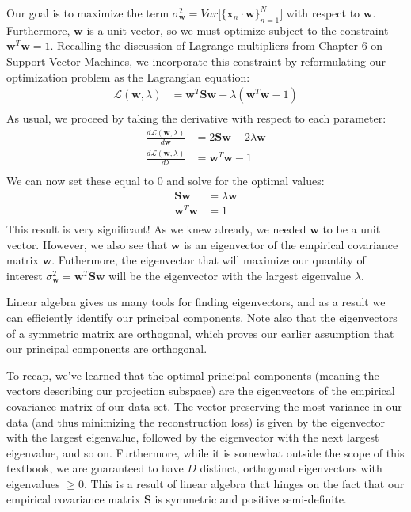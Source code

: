 Our goal is to maximize the term $\sigma^{2}_{\textbf{w}} = Var\big[\{\textbf{x}_{n} \cdot \textbf{w}\}_{n=1}^{N}\big]$ with respect to $\textbf{w}$. Furthermore, $\textbf{w}$ is a unit vector, so we must optimize subject to the constraint $\textbf{w}^{T}\textbf{w} = 1$. Recalling the discussion of Lagrange multipliers from Chapter 6 on Support Vector Machines, we incorporate this constraint by reformulating our optimization problem as the Lagrangian equation:
\begin{align*}
    \mathcal{L}(\textbf{w}, \lambda) &= \textbf{w}^{T} \textbf{S} \textbf{w} - \lambda(\textbf{w}^{T}\textbf{w} - 1) \\
\end{align*}
As usual, we proceed by taking the derivative with respect to each parameter:
\begin{align*}
    \frac{d\mathcal{L}(\textbf{w}, \lambda)}{d\textbf{w}} &= 2\textbf{S} \textbf{w} - 2\lambda\textbf{w} \\
    \frac{d\mathcal{L}(\textbf{w}, \lambda)}{d\lambda} &= \textbf{w}^{T}\textbf{w} - 1 \\
\end{align*}
We can now set these equal to 0 and solve for the optimal values:
\begin{align*}
    \textbf{S} \textbf{w} &= \lambda\textbf{w} \\
    \textbf{w}^{T}\textbf{w} &= 1 \\
\end{align*}
This result is very significant! As we knew already, we needed $\textbf{w}$ to be a unit vector. However, we also see that $\textbf{w}$ is an eigenvector of the empirical covariance matrix $\textbf{w}$. Futhermore, the eigenvector that will maximize our quantity of interest $\sigma^{2}_{\textbf{w}} = \textbf{w}^{T} \textbf{S} \textbf{w}$ will be the eigenvector with the largest eigenvalue $\lambda$.

Linear algebra gives us many tools for finding eigenvectors, and as a result we can efficiently identify our principal components. Note also that the eigenvectors of a symmetric matrix are orthogonal, which proves our earlier assumption that our principal components are orthogonal.


To recap, we've learned that the optimal principal components (meaning the vectors describing our projection subspace) are the eigenvectors of the empirical covariance matrix of our data set. The vector preserving the most variance in our data (and thus minimizing the reconstruction loss) is given by the eigenvector with the largest eigenvalue, followed by the eigenvector with the next largest eigenvalue, and so on. Furthermore, while it is somewhat outside the scope of this textbook, we are guaranteed to have $D$ distinct, orthogonal eigenvectors with eigenvalues $\geq 0$. This is a result of linear algebra that hinges on the fact that our empirical covariance matrix $\textbf{S}$ is symmetric and positive semi-definite.

